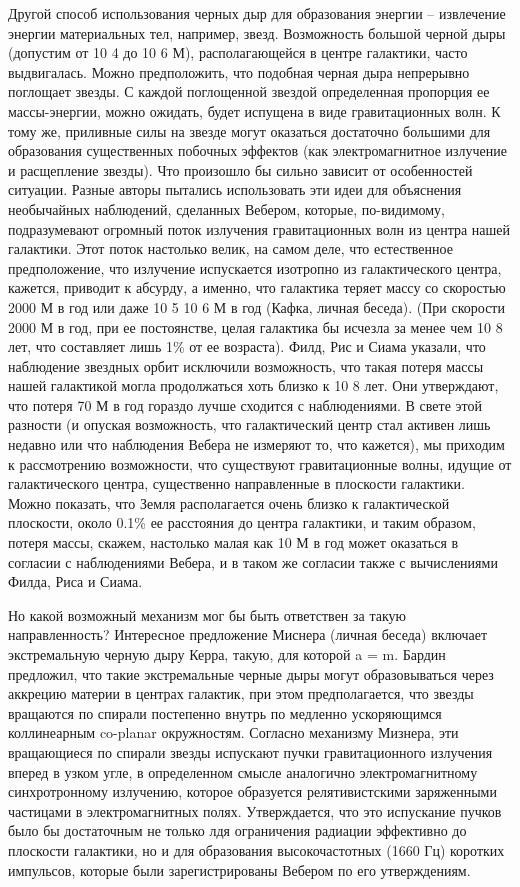 \documentclass[a4paper, 10pt, twocolumn]{article}
\def\q#1{{\color{red} #1}}
\begin{document}
Другой способ использования черных дыр для образования энергии -- 
извлечение энергии материальных тел, например, звезд. Возможность 
большой черной дыры (допустим от 10 4 до 10 6 М), располагающейся 
в центре галактики, часто выдвигалась. Можно предположить, что подобная 
черная дыра непрерывно поглощает звезды. С каждой поглощенной звездой 
определенная пропорция ее массы-энергии, можно ожидать, будет испущена 
в виде гравитационных волн. К тому же, приливные силы на звезде могут 
оказаться достаточно большими для образования существенных побочных 
эффектов (как электромагнитное излучение и расщепление звезды). Что 
произошло бы сильно зависит от особенностей ситуации. Разные авторы 
пытались использовать эти идеи для объяснения необычайных наблюдений, 
сделанных Вебером, которые, по-видимому, подразумевают огромный поток 
излучения гравитационных волн из центра нашей галактики. Этот поток 
настолько велик, на самом деле, что естественное предположение, что 
излучение испускается изотропно из галактического центра, кажется, 
приводит к абсурду, а именно, что галактика теряет массу со скоростью 
2000 М в год или даже 10 5 10 6 М в год (Кафка, личная беседа). (При 
скорости 2000 М в год, при ее постоянстве, целая галактика бы исчезла за 
менее чем 10 8 лет, что составляет лишь 1\% от ее возраста). Филд, Рис 
и Сиама указали, что наблюдение звездных орбит исключили возможность, 
что такая потеря массы нашей галактикой могла продолжаться хоть близко 
к 10 8 лет. Они утверждают, что потеря 70 М в год гораздо лучше сходится 
с наблюдениями. В свете этой разности (и опуская возможность, что 
галактический центр стал активен лишь недавно или что наблюдения Вебера 
не измеряют то, что кажется), мы приходим к рассмотрению возможности, 
что существуют гравитационные волны, идущие от галактического центра, 
существенно направленные в плоскости галактики. Можно показать, что 
Земля располагается очень близко к галактической плоскости, около 0.1\% 
ее расстояния до центра галактики, и таким образом, потеря массы, 
скажем, настолько малая как 10 М в год может оказаться в согласии 
с наблюдениями Вебера, и в таком же согласии также с вычислениями Филда, 
Риса и Сиама.

Но какой возможный механизм мог бы быть ответствен за такую 
направленность? Интересное предложение Миснера (личная беседа) включает 
экстремальную черную  дыру Керра, такую, для которой a = m. Бардин 
предложил, что такие экстремальные черные дыры могут образовываться 
через аккрецию материи в центрах галактик, при этом предполагается, что 
звезды вращаются по спирали постепенно внутрь по медленно ускоряющимся 
коллинеарным \q{co-planar} окружностям. Согласно механизму Мизнера, эти 
вращающиеся по спирали звезды испускают пучки гравитационного излучения 
вперед в узком угле, в определенном смысле аналогично электромагнитному 
синхротронному излучению, которое образуется релятивистскими заряженными 
частицами в электромагнитных полях. Утверждается, что это испускание 
пучков было бы достаточным не только лдя ограничения радиации эффективно 
до плоскости галактики, но и для образования высокочастотных (1660 Гц) 
коротких импульсов, которые были зарегистрированы Вебером по его 
утверждениям.
\end{document}
